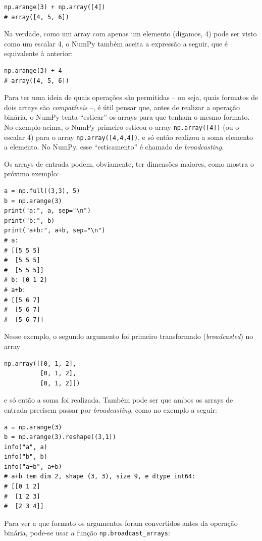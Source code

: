 \documentclass[11pt,a4paper]{article}
\begin{document}
\begin{lstlisting}
np.arange(3) + np.array([4])
# array([4, 5, 6])
\end{lstlisting}

Na verdade, como um array com apenas um elemento (digamos, 4) pode ser
visto como um escalar 4, o NumPy também aceita a expressão a seguir, que
é equivalente à anterior:

\begin{lstlisting}
np.arange(3) + 4
# array([4, 5, 6])
\end{lstlisting}

Para ter uma ideia de quais operações são permitidas -- ou seja, quais
formatos de dois arrays são \emph{compatíveis} --, é útil pensar que,
antes de realizar a operação binária, o NumPy tenta ``esticar'' os
arrays para que tenham o mesmo formato. No exemplo acima, o NumPy
primeiro esticou o array \texttt{np.array([4])} (ou o escalar 4) para o
array \texttt{np.array([4,4,4])}, e só então realizou a soma elemento a
elemento. No NumPy, esse ``esticamento'' é chamado de
\emph{broadcasting}.

Os arrays de entrada podem, obviamente, ter dimensões maiores, como
mostra o próximo exemplo:

\begin{lstlisting}
a = np.full((3,3), 5)
b = np.arange(3)
print("a:", a, sep="\n")
print("b:", b)
print("a+b:", a+b, sep="\n")
# a:
# [[5 5 5]
#  [5 5 5]
#  [5 5 5]]
# b: [0 1 2]
# a+b:
# [[5 6 7]
#  [5 6 7]
#  [5 6 7]]
\end{lstlisting}

Nesse exemplo, o segundo argumento foi primeiro transformado
(\emph{broadcasted}) no array

\begin{lstlisting}
np.array([[0, 1, 2],
          [0, 1, 2],
          [0, 1, 2]])
\end{lstlisting}

e só então a soma foi realizada. Também pode ser que ambos os arrays de
entrada precisem passar por \emph{broadcasting}, como no exemplo a
seguir:

\begin{lstlisting}
a = np.arange(3)
b = np.arange(3).reshape((3,1))
info("a", a)
info("b", b)
info("a+b", a+b)
# a+b tem dim 2, shape (3, 3), size 9, e dtype int64:
# [[0 1 2]
#  [1 2 3]
#  [2 3 4]]
\end{lstlisting}

Para ver a que formato os argumentos foram convertidos antes da
operação binária, pode-se usar a função \texttt{np.broadcast\_arrays}:
\end{document}
